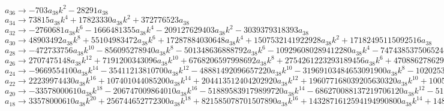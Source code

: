 \documentclass[12pt,a4paper,draft]{article}
\begin{document}
$a_{36}\to -703 a_{38} k^2-28291 a_{38}$\\
$a_{34}\to 73815 a_{38} k^4+17823330 a_{38} k^2+372776523 a_{38}$\\
$a_{32}\to -2760681 a_{38} k^6-1666481355 a_{38} k^4-209127629403 a_{38} k^2-3039379318393 a_{38}$\\
$a_{30}\to 48903492 a_{38} k^8+55104983472 a_{38} k^6+17287884030648 a_{38} k^4+1507532141922928 a_{38} k^2+17182495115092516 a_{38}$\\
$a_{28}\to -472733756 a_{38} k^{10}-856095278940 a_{38} k^8-501348636888792 a_{38} k^6-109296080289412280 a_{38} k^4-7474385375065244460 a_{38} k^2-71524858460924749356 a_{38}$\\
$a_{26}\to 2707475148 a_{38} k^{12}+7191200343096 a_{38} k^{10}+6768206597998692 a_{38} k^8+2754261223293189456 a_{38} k^6+470886278629110400980 a_{38} k^4+27036396498229555256568 a_{38} k^2+227227523204860634882940 a_{38}$\\
$a_{24}\to -9669554100 a_{38} k^{14}-35411213810700 a_{38} k^{12}-48881492096657220 a_{38} k^{10}-31969103484653091900 a_{38} k^8-10202536036964058687900 a_{38} k^6-1464471476987434243064100 a_{38} k^4-73848945041579706336955500 a_{38} k^2-563474740016587168037557140 a_{38}$\\
$a_{22}\to 22239974430 a_{38} k^{16}+107401044085200 a_{38} k^{14}+204413512404202920 a_{38} k^{12}+196077168039205630320 a_{38} k^{10}+100567855221502864209300 a_{38} k^8+26946275176568790072379440 a_{38} k^6+3397051471912666491499953000 a_{38} k^4+155519028244578058378365770640 a_{38} k^2+1106197407114626567662836917310 a_{38}$\\
$a_{20}\to -33578000610 a_{38} k^{18}-206747009864010 a_{38} k^{16}-518895839179899720 a_{38} k^{14}-686270088137219706120 a_{38} k^{12}-516248323470381369607740 a_{38} k^{10}-222306770206692518097130380 a_{38} k^8-52314592667455063969099276200 a_{38} k^6-5987482587416255247567082169640 a_{38} k^4-255531601043478737130115327898610 a_{38} k^2-1733407305648580434134868375529210 a_{38}$\\
$a_{18}\to 33578000610 a_{38} k^{20}+256744652772300 a_{38} k^{18}+821585078701507890 a_{38} k^{16}+1432871612594194990800 a_{38} k^{14}+1486169416051097882204100 a_{38} k^{12}+938628585317146187521217160 a_{38} k^{10}+354991878814873648361745088500 a_{38} k^8+75841446107272566469183040815440 a_{38} k^6+8091834033043493342453652050122650 a_{38} k^4+329347388073230282485624991350549900 a_{38} k^2+2175787090985907436048495009322534554 a_{38}$\\
\end{document}
